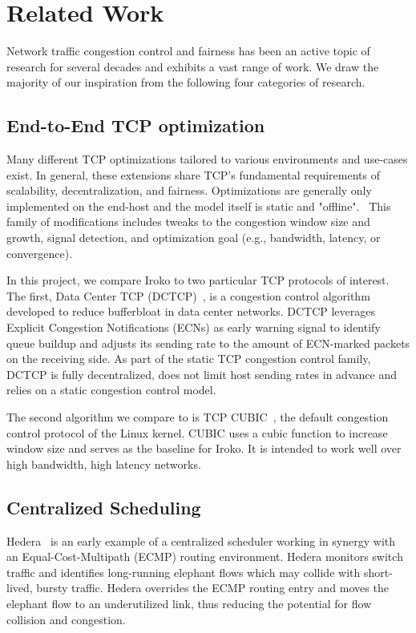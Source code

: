 \section{Related Work}
\label{sec:related}
Network traffic congestion control and fairness has been an active topic of 
research for several decades and exhibits a vast range of work. We draw the 
majority of our inspiration from the following four categories of research.

\subsection{End-to-End TCP optimization}
Many different TCP optimizations tailored to various environments and use-cases 
exist. In general, these extensions share TCP's fundamental requirements of 
scalability, decentralization, and fairness. Optimizations are generally only 
implemented on the end-host and the model itself is static and 
"offline".~\cite{throwdown} This family of modifications includes tweaks to the 
congestion window size and growth, signal detection, and optimization goal 
(e.g., bandwidth, latency, or convergence).~\cite{tcp_family}

In this project, we compare Iroko to two particular TCP protocols of interest.  
The first, Data Center TCP (DCTCP)~\cite{dctcp}, is a congestion control 
algorithm developed to reduce bufferbloat in data center networks. DCTCP 
leverages Explicit Congestion Notifications (ECNs) as early warning signal to 
identify queue buildup and adjusts its sending rate to the amount of ECN-marked 
packets on the receiving side. As part of the static TCP congestion control 
family, DCTCP is fully decentralized, does not limit host sending rates in 
advance and relies on a static congestion control model.

The second algorithm we compare to is TCP CUBIC~\cite{cubic}, the default 
congestion control protocol of the Linux kernel. CUBIC uses a cubic function   
to increase window size and serves as the baseline for Iroko. It is intended to 
work well over high bandwidth, high latency networks.

\subsection{Centralized Scheduling}
Hedera~\cite{hedera} is an early example of a centralized scheduler working in 
synergy with an Equal-Cost-Multipath (ECMP) routing environment. Hedera 
monitors switch traffic and identifies long-running elephant flows which may 
collide with short-lived, bursty traffic. Hedera overrides the ECMP routing 
entry and moves the elephant flow to an underutilized link, thus reducing the 
potential for flow collision and congestion.


